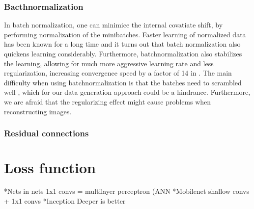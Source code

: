 \subsubsection{Bacthnormalization}
In batch normalization, one can minimice the internal covatiate shift, by performing normalization of the minibatches\cite{Inceptionv2}. Faster learning of normalized data has been known for a long time and it turns out that batch normalization also quickens learning considerably\cite{Inceptionv2}. Furthermore, batchnormalization also stabilizes the learning, allowing for much more aggressive learning rate and less regularization, increasing convergence speed by a factor of 14 in \cite{Inceptionv2}. The main difficulty when using batchnormalization is that the batches need to scrambled well \cite{Inceptionv2}, which for our data generation approach could be a hindrance. Furthermore, we are afraid that the regularizing effect might cause problems when reconstructing images.

\subsubsection{Residual connections}



\section{Loss function}

*Nets in nets 1x1 convs = multilayer perceptron (ANN
*Mobilenet shallow convs + 1x1 convs
*Inception Deeper is better

